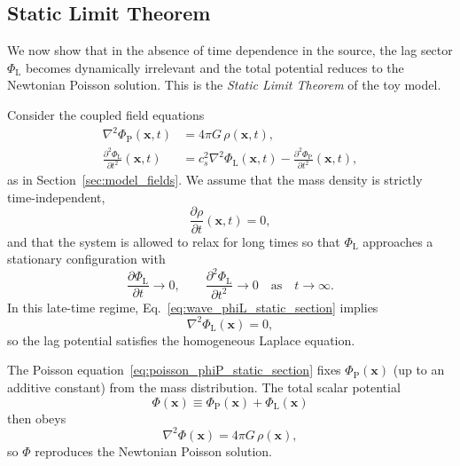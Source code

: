 \documentclass[11pt]{article}
\newcommand{\cS}{c_s}
\newcommand{\PhiP}{\Phi_{\mathrm{P}}}
\newcommand{\PhiL}{\Phi_{\mathrm{L}}}
\begin{document}
\subsection{Static Limit Theorem}
\label{sec:static_limit_theorem}

We now show that in the absence of time dependence in the source, the lag sector $\PhiL$ becomes dynamically irrelevant and the total potential reduces to the Newtonian Poisson solution. This is the \emph{Static Limit Theorem} of the toy model.

Consider the coupled field equations
\begin{align}
  \nabla^2 \PhiP(\mathbf{x},t)
  &= 4\pi G\,\rho(\mathbf{x},t),
  \label{eq:poisson_phiP_static_section}
  \\
  \frac{\partial^2 \PhiL}{\partial t^2}(\mathbf{x},t)
  &= \cS^2 \nabla^2 \PhiL(\mathbf{x},t)
   - \frac{\partial^2 \PhiP}{\partial t^2}(\mathbf{x},t),
  \label{eq:wave_phiL_static_section}
\end{align}
as in Section~\ref{sec:model_fields}. We assume that the mass density is strictly time-independent,
\begin{equation}
  \frac{\partial \rho}{\partial t}(\mathbf{x},t) = 0,
\end{equation}
and that the system is allowed to relax for long times so that $\PhiL$ approaches a stationary configuration with
\begin{equation}
  \frac{\partial \PhiL}{\partial t} \to 0,
  \qquad
  \frac{\partial^2 \PhiL}{\partial t^2} \to 0
  \quad \text{as} \quad t \to \infty.
\end{equation}
In this late-time regime, Eq.~\eqref{eq:wave_phiL_static_section} implies
\begin{equation}
  \nabla^2 \PhiL(\mathbf{x}) = 0,
\end{equation}
so the lag potential satisfies the homogeneous Laplace equation.

The Poisson equation~\eqref{eq:poisson_phiP_static_section} fixes $\PhiP(\mathbf{x})$ (up to an additive constant) from the mass distribution. The total scalar potential
\begin{equation}
  \Phi(\mathbf{x}) \equiv \PhiP(\mathbf{x}) + \PhiL(\mathbf{x})
\end{equation}
then obeys
\begin{equation}
  \nabla^2 \Phi(\mathbf{x}) = 4\pi G\,\rho(\mathbf{x}),
\end{equation}
so $\Phi$ reproduces the Newtonian Poisson solution.
\end{document}
